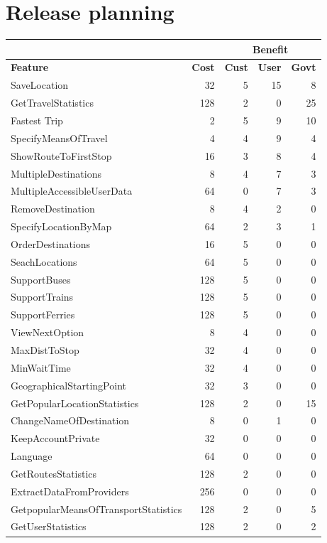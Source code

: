 \documentclass[a4paper]{article}
\begin{document}
	\section{Release planning}
		\begin{table}[h]
			\begin{tabular}{|l|r|r|r|r|} \hline
				\multicolumn{2}{|l|}{}	& \multicolumn{3}{c|}{\textbf{Benefit}} \\ \hline
				\textbf{Feature} & \textbf{Cost} & \textbf{Cust} & \textbf{User} & \textbf{Govt} \\ \hline
				SaveLocation	& 32 & 5 & 15 & 8 \\ 
				GetTravelStatistics	& 128 & 2 & 0 & 25 \\
				Fastest Trip	& 2 & 5 & 9 & 10 \\
				SpecifyMeansOfTravel	& 4 & 4	& 9 & 4 \\
				ShowRouteToFirstStop	& 16 & 3 & 8 & 4 \\
				MultipleDestinations	& 8 & 4 & 7 &3 \\
				MultipleAccessibleUserData	& 64 & 0 & 7 & 3 \\
				RemoveDestination	& 8 & 4 & 2 & 0 \\
				SpecifyLocationByMap	& 64 & 2 & 3 & 1 \\
				OrderDestinations	& 16 & 5 & 0 & 0 \\
				SeachLocations	& 64 &5 & 0 & 0 \\
				SupportBuses	& 128 & 5 & 0 & 0 \\
				SupportTrains	& 128 & 5 & 0 & 0 \\
				SupportFerries	& 128 & 5 & 0 & 0 \\
				ViewNextOption	& 8 & 4 & 0 & 0 \\
				MaxDistToStop	& 32 & 4 & 0 & 0 \\
				MinWaitTime	& 32 & 4 & 0 & 0 \\
				GeographicalStartingPoint	& 32 & 3 & 0 & 0 \\
				GetPopularLocationStatistics	& 128 & 2 & 0 & 15 \\ 
				ChangeNameOfDestination	& 8 & 0 & 1 & 0 \\
				KeepAccountPrivate	& 32 & 0 & 0 & 0 \\
				Language	& 64 & 0 & 0 & 0 \\
				GetRoutesStatistics	& 128 & 2 & 0 & 0 \\
				ExtractDataFromProviders	& 256 & 0 & 0 & 0 \\
				GetpopularMeansOfTransportStatistics	& 128 & 2 & 0 & 5 \\
				GetUserStatistics	& 128 & 2 & 0 & 2 \\ \hline
		\end{tabular}
	\end{table}
		
\end{document}
